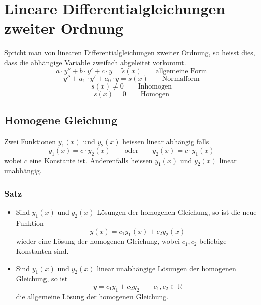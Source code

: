 \scriptsize

\normalsize

\newpage
\footnotesize

\normalsize

\newpage

\section{Lineare Differentialgleichungen zweiter Ordnung}
Spricht man von linearen Differentialgleichungen zweiter Ordnung, 
so heisst dies, dass die abhängige Variable zweifach abgeleitet
vorkommt.
\[ a\cdot y'' + b \cdot y' + c \cdot y = \tilde{s}(x) 
   \qquad \text{allgemeine Form}\]
\[ y'' + a_1 \cdot y' + a_0 \cdot y = s(x) 
   \qquad \text{Normalform}\]
   \[  s(x) \neq 0 \qquad \text{Inhomogen} \]
   \[  s(x) =    0 \qquad \text{Homogen} \]

\subsection{Homogene Gleichung}
Zwei Funktionen $y_1(x)$ und $y_2(x)$ heissen linear abhängig falls
\[ y_1(x)=c \cdot y_2(x) \qquad \text{oder} \qquad y_2(x)=c \cdot y_1(x) \]
wobei $c$ eine Konstante ist. Anderenfalls heissen $y_1(x)$ und $y_2(x)$
linear unabhängig.

\subsubsection{Satz}
\begin{itemize}
  \item Sind $y_1(x)$ und $y_2(x)$ Lösungen der homogenen Gleichung,
	so ist die neue Funktion 
	\[ y(x) = c_1y_1(x) + c_2y_2(x) \]
	wieder eine Lösung der homogenen Gleichung, wobei $c_1, c_2$
	beliebige Konstanten sind.
  \item Sind $y_1(x)$ und $y_2(x)$ linear unabhängige Lösungen der 
	homogenen Gleichung, so ist
	\[ y=c_1y_1 + c_2y_2 \qquad c_1, c_2 \in \mathbb{R} \]
	die allgemeine Lösung der homogenen Gleichung.
\end{itemize}

